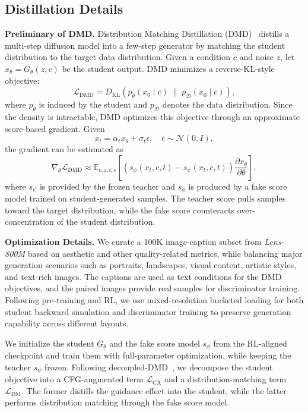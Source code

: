 \documentclass{llmxive}
\begin{document}
\subsection{Distillation Details}
\label{sec:Distill-Details}

\noindent\textbf{Preliminary of DMD.}
Distribution Matching Distillation (DMD)~\citep{dmd} distills a multi-step diffusion model into a few-step generator by matching the student distribution to the target data distribution. Given a condition $c$ and noise $z$, let $x_\theta=G_\theta(z,c)$ be the student output. DMD minimizes a reverse-KL-style objective:
\begin{equation*}
\mathcal{L}_{\mathrm{DMD}}
=
D_{\mathrm{KL}}
\left(
p_\theta(x_0 \mid c)
\;\|\;
p_{\mathcal{D}}(x_0 \mid c)
\right),
\end{equation*}
where $p_\theta$ is induced by the student and $p_{\mathcal{D}}$ denotes the data distribution. Since the density is intractable, DMD optimizes this objective through an approximate score-based gradient. Given
\begin{equation*}
x_t=\alpha_t x_\theta+\sigma_t\epsilon,
\quad
\epsilon\sim\mathcal{N}(0,I),
\end{equation*}
the gradient can be estimated as
\begin{equation*}
\nabla_\theta \mathcal{L}_{\mathrm{DMD}}
\approx
\mathbb{E}_{c,z,t,\epsilon}
\left[
\left(
s_\phi(x_t,c,t)
-
s_\psi(x_t,c,t)
\right)
\frac{\partial x_\theta}{\partial \theta}
\right],
\end{equation*}
where $s_\psi$ is provided by the frozen teacher and $s_\phi$ is produced by a fake score model trained on student-generated samples. The teacher score pulls samples toward the target distribution, while the fake score counteracts over-concentration of the student distribution.

\noindent\textbf{Optimization Details.}
We curate a 100K image-caption subset from \textit{Lens-800M} based on aesthetic and other quality-related metrics, while balancing major generation scenarios such as portraits, landscapes, visual content, artistic styles, and text-rich images. The captions are used as text conditions for the DMD objectives, and the paired images provide real samples for discriminator training. Following pre-training and RL, we use mixed-resolution bucketed loading for both student backward simulation and discriminator training to preserve generation capability across different layouts.

We initialize the student $G_\theta$ and the fake score model $s_\phi$ from the RL-aligned checkpoint and train them with full-parameter optimization, while keeping the teacher $s_\psi$ frozen. Following decoupled-DMD~\citep{decoupleddmd}, we decompose the student objective into a CFG-augmented term $\mathcal{L}_{\mathrm{CA}}$ and a distribution-matching term $\mathcal{L}_{\mathrm{DM}}$. The former distills the guidance effect into the student, while the latter performs distribution matching through the fake score model.
\end{document}
